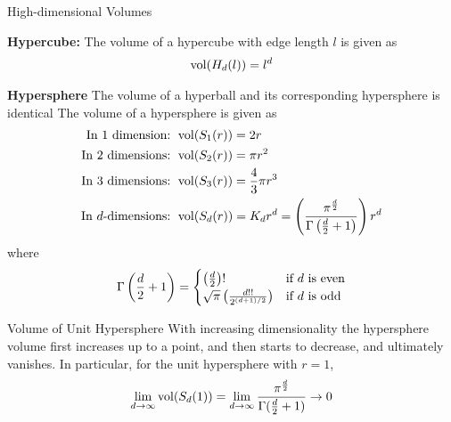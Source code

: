 \begin{frame}{High-dimensional Volumes}
%


{\bf Hypercube:}
The volume of a hypercube with edge length $l$ is given as
\begin{align*}
\vol(H_d(l)) = l^d
\end{align*}
%

\medskip
{\bf Hypersphere}%
The volume of a hyperball and its corresponding hypersphere
is identical
The volume of a hypersphere is given as
\begin{align*}
  \text{In 1 dimension: } & \vol(S_1(r)) = 2r \\
  \text{In 2 dimensions: } & \vol(S_2(r)) = \pi r^2 \\
  \text{In 3 dimensions: } & \vol(S_3(r)) = \frac{4}{3}\pi r^3 \\
\text{In $d$-dimensions: } & \vol(S_d(r))=K_d r^d =
\lB(\frac{\pi^{\frac{d}{2}}}{\Gamma\lB(\frac{d}{2}+1\rB)}\rB) r^d
\end{align*}
where
\begin{align*}
\Gamma\left(\frac{d}{2}+1\right) =
\begin{cases}
  {\left(\frac{d}{2}\right)}! & \text{if $d$ is even}\\
  \sqrt{\pi}\left(\frac{d!!}{2^{(d+1)/2}}\right) & \text{if $d$ is odd}
\end{cases}
\end{align*}
\end{frame}


\begin{frame}{Volume of Unit Hypersphere}
  \small
With increasing dimensionality the hypersphere volume 
f\/{i}rst increases up to a point, and then
starts to decrease, and ultimately vanishes. In particular, for the
unit hypersphere with $r=1$,
\begin{align*}
\lim_{d\to\infty} \vol(S_d(1)) =
\lim_{d\to\infty}\frac{\pi^{\frac{d}{2}}}{\Gamma(\frac{d}{2}+1)} \to 0
\end{align*}
    
\normalsize
\centerline{
}
\end{frame}


